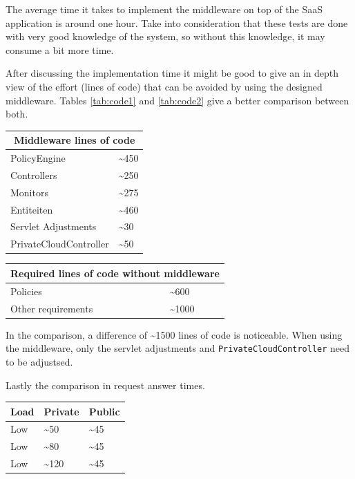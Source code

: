 \documentclass[journal]{IEEEtran}
\begin{document}
The average time it takes to implement the middleware on top of the SaaS application is around one hour.
Take into consideration that these tests are done with very good knowledge of the system, so without this knowledge, it may consume a bit more time.\newline

After discussing the implementation time it might be good to give an in depth view of the effort (lines of code) that can be avoided by using the designed middleware.  
Tables \ref{tab:code1} and \ref{tab:code2} give a better comparison between both.

 \label{tab:code1} 
\begin{center}
\begin{tabular}{ |l|l| } \hline \multicolumn{2}{|c|}{Middleware lines of code} \\
\hline
PolicyEngine & \textasciitilde450\\
Controllers & \textasciitilde250\\
Monitors & \textasciitilde275\\
Entiteiten & \textasciitilde460\\\hline
Servlet Adjustments & \textasciitilde30\\
PrivateCloudController & \textasciitilde50\\
\hline 
\end{tabular}
\end{center}

 \label{tab:code2} 
\begin{center}
\begin{tabular}{ |l|l| } \hline \multicolumn{2}{|c|}{Required lines of code without middleware} \\
\hline
Policies & \textasciitilde600\\
Other requirements & \textasciitilde1000\\
\hline 
\end{tabular}
\end{center}

In the comparison, a difference of \textasciitilde1500 lines of code is noticeable.  When using the middleware, only the servlet adjustments and \texttt{PrivateCloudController} need to be adjustsed.

Lastly the comparison in request answer times.

\begin{center}
\begin{tabular}{ |l|l|l| } \hline Load & Private & Public \\
\hline
Low & \textasciitilde50 & \textasciitilde45\\
Low & \textasciitilde80 & \textasciitilde45\\
Low & \textasciitilde120 & \textasciitilde45\\
\hline 
\end{tabular}
\end{center}
 \label{tab:code3} 
\end{document}
